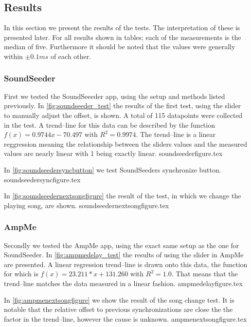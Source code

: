 \subsection{Results}
In this section we present the results of the tests.
The interpretation of these is presented later.
For all results shown in tables; each of the measurements is the median of five. 
Furthermore it should be noted that the values were generally within $\pm 0.1 ms$ of each other. 

\subsubsection{SoundSeeder}
First we tested the SoundSeeeder app, using the setup and methods listed previously.
In \vref{fig:soundseeder_test} the results of the first test, using the slider to manually adjust the offset, is shown. 
A total of 115 datapoints were collected in the test.
A trend--line for this data can be described by the function $f(x) = 0.9744x - 70.497$ with $R^2=0.9974$.
The trend--line is a linear reggression meaning the relationship between the sliders values and the measured values are nearly linear with 1 being exactly linear.
{soundseederfigure.tex}

In \vref{fig:soundseedersyncbutton} we test SoundSeeders synchronize button.
{soundseedersyncfigure.tex}

In \vref{fig:soundseedernextsongfigure} the result of the test, in which we change the playing song, are shown. 
{soundseedernextsongfigure.tex}

\subsubsection{AmpMe}
Secondly we tested the AmpMe app, using the exact same setup as the one for SoundSeeder. 
In \vref{fig:ampmedelay_test} the results of using the slider in AmpMe are presented.
A linear regression trend--line is drawn onto this data, the function for which is $f(x) = 23.211 * x + 131.260$ with $R^2 = 1.0$.
That means that the trend--line matches the data measured in a linear fashion. 
{ampmedelayfigure.tex}

In \vref{fig:ampmenextsongfigure} we show the result of the song change test. 
It is notable that the relative offset to previous synchronizations are close the the factor in the trend--line, however the cause is unknown. 
{ampmenextsongfigure.tex}

